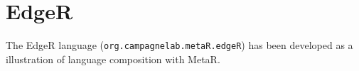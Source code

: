 

\chapter{EdgeR}\label{chap:EdgeR}
The EdgeR language (\texttt{org.campagnelab.metaR.edgeR}) has been developed as a illustration of language composition with MetaR.